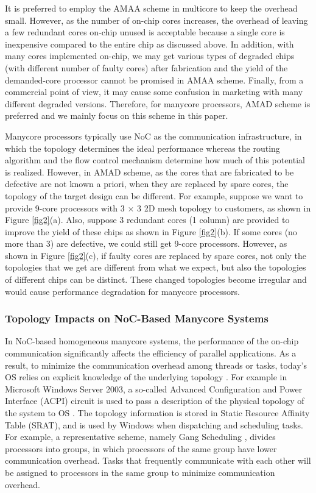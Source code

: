 It is preferred to employ the AMAA scheme in multicore to keep the overhead small. However, as the number of on-chip cores increases, the overhead of leaving a few redundant cores on-chip unused is acceptable because a single core is inexpensive compared to the entire chip as discussed above. In addition, with many cores implemented on-chip, we may get various types of degraded chips (with different number of faulty cores) after fabrication and the yield of the demanded-core processor cannot be promised in AMAA scheme. Finally, from a commercial point of view, it may cause some confusion in marketing with many different degraded versions. Therefore, for manycore processors, AMAD scheme is preferred and we mainly focus on this scheme in this paper.

Manycore processors typically use NoC as the communication infrastructure, in which the topology determines the ideal performance whereas the routing algorithm and the flow control mechanism determine how much of this potential is realized. However, in AMAD scheme, as the cores that are fabricated to be defective are not known a priori, when they are replaced by spare cores, the topology of the target design can be different. For example, suppose we want to provide 9-core processors with 3 $\times$ 3 2D mesh topology to customers, as shown in Figure \ref{fig2}(a). Also, suppose 3 redundant cores (1 column) are provided to improve the yield of these chips as shown in Figure \ref{fig2}(b). If some cores (no more than 3) are defective, we could still get 9-core processors. However, as shown in Figure \ref{fig2}(c), if faulty cores are replaced by spare cores, not only the topologies that we get are different from what we expect, but also the topologies of different chips can be distinct. These changed topologies become irregular and would cause performance degradation for manycore processors.

\subsubsection{Topology Impacts on NoC-Based Manycore Systems}

In NoC-based homogeneous manycore systems, the performance of the on-chip communication significantly affects the efficiency of parallel applications. As a result, to minimize the communication overhead among threads or tasks, today’s OS relies on explicit knowledge of the underlying topology \cite{stallings2012operating}. For example in Microsoft Windows Server 2003, a so-called Advanced Configuration and Power Interface (ACPI) circuit is used to pass a description of the physical topology of the system to OS \cite{Microsoft2007numa}. The topology information is stored in Static Resource Affinity Table (SRAT), and is used by Windows when dispatching and scheduling tasks. For example, a representative scheme, namely Gang Scheduling \cite{gupta1991impact}, divides processors into groups, in which processors of the same group have lower communication overhead. Tasks that frequently communicate with each other will be assigned to processors in the same group to minimize communication overhead.

